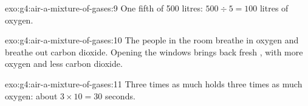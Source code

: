 \begin{solution}{exo:g4:air-a-mixture-of-gases:9}
One fifth of 500 litres: $500 \div 5 = 100$ litres of oxygen.
\end{solution}

\begin{solution}{exo:g4:air-a-mixture-of-gases:10}
The people in the room breathe in oxygen and breathe out carbon
dioxide. Opening the windows brings back fresh , with more oxygen and
less carbon dioxide.
\end{solution}

\begin{solution}{exo:g4:air-a-mixture-of-gases:11}
Three times as much  holds three times as much oxygen: about
$3 \times 10 = 30$ seconds.
\end{solution}
